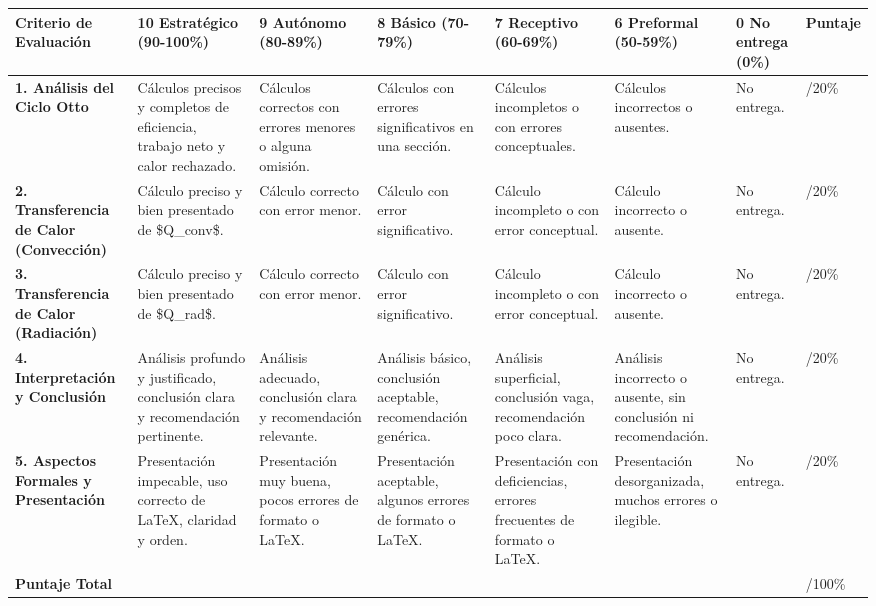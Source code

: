 \documentclass{article}
\begin{document}
\begin{tabularx}{\textwidth}{|X|X|X|X|X|X|X|X|}
\hline
\textbf{Criterio de Evaluación} & \textbf{10 Estratégico (90-100\%)} & \textbf{9 Autónomo (80-89\%)} & \textbf{8 Básico (70-79\%)} & \textbf{7 Receptivo (60-69\%)} & \textbf{6 Preformal (50-59\%)} & \textbf{0 No entrega (0\%)} & \textbf{Puntaje} \\
\hline
\textbf{1. Análisis del Ciclo Otto} & Cálculos precisos y completos de eficiencia, trabajo neto y calor rechazado. & Cálculos correctos con errores menores o alguna omisión. & Cálculos con errores significativos en una sección. & Cálculos incompletos o con errores conceptuales. & Cálculos incorrectos o ausentes. & No entrega. & /20\% \\
\hline
\textbf{2. Transferencia de Calor (Convección)} & Cálculo preciso y bien presentado de \$Q_{conv}\$. & Cálculo correcto con error menor. & Cálculo con error significativo. & Cálculo incompleto o con error conceptual. & Cálculo incorrecto o ausente. & No entrega. & /20\% \\
\hline
\textbf{3. Transferencia de Calor (Radiación)} & Cálculo preciso y bien presentado de \$Q_{rad}\$. & Cálculo correcto con error menor. & Cálculo con error significativo. & Cálculo incompleto o con error conceptual. & Cálculo incorrecto o ausente. & No entrega. & /20\% \\
\hline
\textbf{4. Interpretación y Conclusión} & Análisis profundo y justificado, conclusión clara y recomendación pertinente. & Análisis adecuado, conclusión clara y recomendación relevante. & Análisis básico, conclusión aceptable, recomendación genérica. & Análisis superficial, conclusión vaga, recomendación poco clara. & Análisis incorrecto o ausente, sin conclusión ni recomendación. & No entrega. & /20\% \\
\hline
\textbf{5. Aspectos Formales y Presentación} & Presentación impecable, uso correcto de LaTeX, claridad y orden. & Presentación muy buena, pocos errores de formato o LaTeX. & Presentación aceptable, algunos errores de formato o LaTeX. & Presentación con deficiencias, errores frecuentes de formato o LaTeX. & Presentación desorganizada, muchos errores o ilegible. & No entrega. & /20\% \\
\hline
\textbf{Puntaje Total} & & & & & & & /100\% \\
\hline
\end{tabularx}
\end{document}
